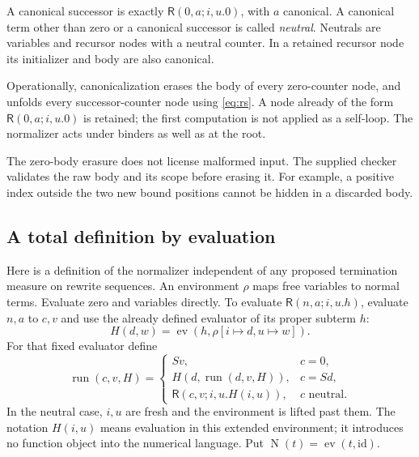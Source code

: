 \documentclass[11pt]{article}
\theoremstyle{definition}
\theoremstyle{remark}
\newcommand{\R}{\mathsf R}
\newcommand{\NF}{\operatorname{N}}
\begin{document}
A canonical successor is exactly $\R(0,a;i,u.0)$, with $a$
canonical. A canonical term other than zero or a canonical successor
is called \emph{neutral}. Neutrals are variables and recursor nodes
with a neutral counter. In a retained recursor node its initializer
and body are also canonical.

Operationally, canonicalization erases the body of every zero-counter
node, and unfolds every successor-counter node using
\eqref{eq:rs}. A node already of the form $\R(0,a;i,u.0)$ is
retained; the first computation is not applied as a self-loop.
The normalizer acts under binders as well as at the root.

The zero-body erasure does not license malformed input. The supplied
checker validates the raw body and its scope before erasing it.
For example, a positive index outside the two new bound positions
cannot be hidden in a discarded body.

\subsection{A total definition by evaluation}

Here is a definition of the normalizer independent of any proposed
termination measure on rewrite sequences. An environment $\rho$
maps free variables to normal terms. Evaluate zero and variables
directly. To evaluate $\R(n,a;i,u.h)$, evaluate $n,a$ to $c,v$ and
use the already defined evaluator of its proper subterm $h$:
\[
 H(d,w)=\operatorname{ev}(h,\rho[i\mapsto d,u\mapsto w]).
\]
For that fixed evaluator define
\[
 \operatorname{run}(c,v,H)=
 \begin{cases}
 Sv,&c=0,\\
 H(d,\operatorname{run}(d,v,H)),&c=Sd,\\
 \R(c,v;i,u.H(i,u)),&c\text{ neutral}.
 \end{cases}                                                \tag{N}
\]
In the neutral case, $i,u$ are fresh and the environment is lifted
past them. The notation $H(i,u)$ means evaluation in this extended
environment; it introduces no function object into the numerical
language. Put $\NF(t)=\operatorname{ev}(t,\mathrm{id})$.
\end{document}

